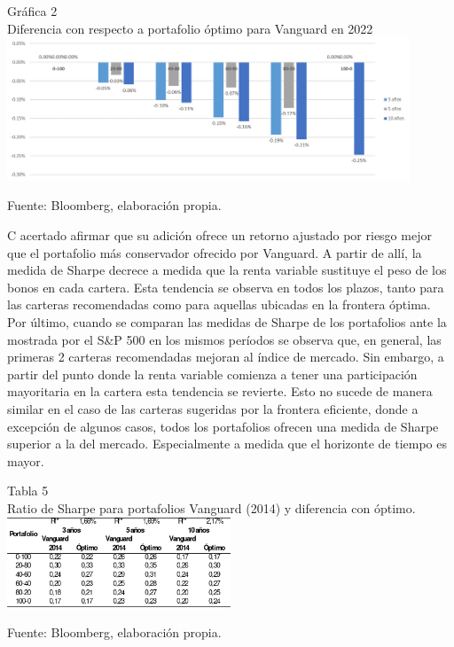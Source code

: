 \documentclass[a4paper,fleqn]{cas-sc}
\begin{document}
\begin{center}
    Gráfica 2\\
    Diferencia con respecto a portafolio óptimo para Vanguard en 2022\\

    \includegraphics[width=0.9\textwidth]{image/imagen2.png}

    \tiny Fuente: Bloomberg, elaboración propia.
\end{center}

C acertado afirmar que su adición ofrece un retorno ajustado por riesgo mejor que el portafolio más conservador ofrecido por Vanguard. A partir de allí, la medida de Sharpe decrece a medida que la renta variable sustituye el peso de los bonos en cada cartera. Esta tendencia se observa en todos los plazos, tanto para las carteras recomendadas como para aquellas ubicadas en la frontera óptima. 
Por último, cuando se comparan las medidas de Sharpe de los portafolios ante la mostrada por el S\&P 500 en los mismos períodos se observa que, en general, las primeras 2 carteras recomendadas mejoran al índice de mercado. Sin embargo, a partir del punto donde la renta variable comienza a tener una participación mayoritaria en la cartera esta tendencia se revierte. Esto no sucede de manera similar en el caso de las carteras sugeridas por la frontera eficiente, donde a excepción de algunos casos, todos los portafolios ofrecen una medida de Sharpe superior a la del mercado. Especialmente a medida que el horizonte de tiempo es mayor. 

\begin{center}
    Tabla 5\\
    Ratio de Sharpe para portafolios Vanguard (2014) y diferencia con óptimo.\\

	\includegraphics[width=0.5\textwidth]{image/tabla5.png}

	\tiny Fuente: Bloomberg, elaboración propia.
\end{center}
\end{document}
